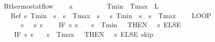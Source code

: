 \documentclass[envcountsame]{llncs}
\begin{document}
\begin{example}\label{ex:therm-rsol}
\begin{isabellebody}
\isamarkupfalse%
\ R{\isacharunderscore}thermostat{\isacharunderscore}flow{\isacharcolon}\ \isanewline
\ \ \ {\isachardoublequoteopen}a\ {\isachargreater}\ {}{\isachardoublequoteclose}\ \ {\isachardoublequoteopen}{}\ {\isasymle}\ {\isasymtau}{\isachardoublequoteclose}\ \ {\isachardoublequoteopen}{}\ {\isacharless}\ Tmin{\isachardoublequoteclose}\ \ {\isachardoublequoteopen}Tmax\ {\isacharless}\ L{\isachardoublequoteclose}\isanewline
\ \ \ {\isachardoublequoteopen}Ref\ {\isasymlceil}{\isasymlambda}s{\isachardot}\ Tmin\ {\isasymle}\ s{\isachardollar}{}\ {\isasymand}\ s{\isachardollar}{}\ {\isasymle}\ Tmax\ {\isasymand}\ s{\isachardollar}{}\ {\isacharequal}\ {}{\isasymrceil}\ {\isasymlceil}{\isasymlambda}s{\isachardot}\ Tmin\ {\isasymle}\ s{\isachardollar}{}\ {\isasymand}\ s{\isachardollar}{}\ {\isasymle}\ Tmax{\isasymrceil}\ {\isasymge}\ \isanewline
\ \ {\isacharparenleft}LOOP\ \isanewline
\ \ \ \ %
\isanewline
\ \ \ \ {\isacharparenleft}{\isacharparenleft}{}\ {\isacharcolon}{\isacharcolon}{\isacharequal}\ {\isacharparenleft}{\isasymlambda}s{\isachardot}\ {}{\isacharparenright}{\isacharparenright}{\isacharsemicolon}{\isacharparenleft}{}\ {\isacharcolon}{\isacharcolon}{\isacharequal}\ {\isacharparenleft}{\isasymlambda}s{\isachardot}\ s{\isachardollar}{}{\isacharparenright}{\isacharparenright}{\isacharsemicolon}\isanewline
\ \ \ \ {\isacharparenleft}IF\ {\isacharparenleft}{\isasymlambda}s{\isachardot}\ s{\isachardollar}{}\ {\isacharequal}\ {}\ {\isasymand}\ s{\isachardollar}{}\ {\isasymle}\ Tmin\ {\isacharplus}\ {}{\isacharparenright}\ THEN\ {\isacharparenleft}{}\ {\isacharcolon}{\isacharcolon}{\isacharequal}\ {\isacharparenleft}{\isasymlambda}s{\isachardot}{}{\isacharparenright}{\isacharparenright}\ ELSE\ \isanewline
\ \ \ \ {\isacharparenleft}IF\ {\isacharparenleft}{\isasymlambda}s{\isachardot}\ s{\isachardollar}{}\ {\isacharequal}\ {}\ {\isasymand}\ s{\isachardollar}{}\ {\isasymge}\ Tmax\ {\isacharminus}\ {}{\isacharparenright}\ THEN\ {\isacharparenleft}{}\ {\isacharcolon}{\isacharcolon}{\isacharequal}\ {\isacharparenleft}{\isasymlambda}s{\isachardot}{}{\isacharparenright}{\isacharparenright}\ ELSE\ skip{\isacharparenright}{\isacharparenright}{\isacharsemicolon}\isanewline

\end{isabellebody}
\end{example}
\end{document}
